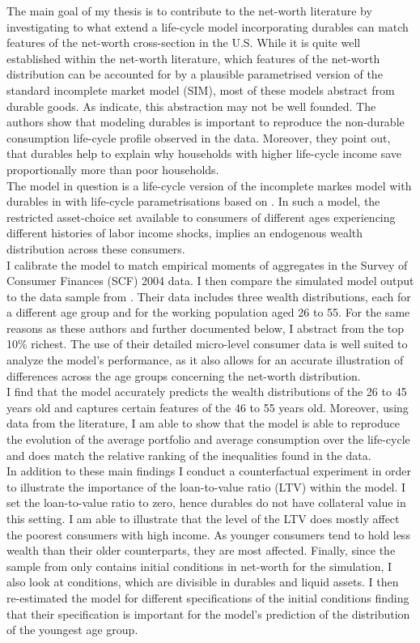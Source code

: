 \documentclass[a4paper,12pt,legno]{article}
\begin{document}
The main goal of my thesis is to contribute to the net-worth literature by investigating to what extend a life-cycle model incorporating durables can match features of the net-worth cross-section in the U.S. While it is quite well established within the net-worth literature, which features of the net-worth distribution can be accounted for by a plausible parametrised version of the standard incomplete market model (SIM), most of these models abstract from durable goods. As \cite{FV&K2011}  indicate, this abstraction may not be well founded. The authors show that modeling durables is important to reproduce the non-durable consumption life-cycle profile observed in the data. Moreover, they point out, that durables help to explain why households with higher life-cycle income save proportionally more than poor households.\\
The model in question is a life-cycle version of the incomplete markes model with durables in \cite{hintermaier2010} with life-cycle parametrisations based on \cite{hintermaier2011}. In such a model, the restricted asset-choice set available to consumers of different ages experiencing different histories of labor income shocks, implies an endogenous wealth distribution across these consumers. \\
I calibrate the model to match empirical moments of aggregates in the Survey of Consumer Finances (SCF) 2004 data. I then compare the simulated model output to the data sample from \cite{hintermaier2011}. Their data includes three wealth distributions, each for a different age group and for the working population aged 26 to 55. For the same reasons as these authors and further documented below, I abstract from the top 10\% richest. The use of their detailed micro-level consumer data is well suited to analyze the model's performance, as it also allows for an accurate illustration of differences across the age groups concerning the net-worth distribution.\\
I find that the model accurately predicts the wealth distributions of the 26 to 45 years old and captures certain features of the 46 to 55 years old. Moreover, using data from the literature, I am able to show that the model is able to reproduce the evolution of the average portfolio and average consumption over the life-cycle and does match the relative ranking of the inequalities found in the data. 
\\ 
In addition to these main findings I conduct a counterfactual experiment in order to illustrate the importance of the loan-to-value ratio (LTV) within the model. I set the loan-to-value ratio to zero, hence durables do not have collateral value in this setting. I am able to illustrate that the level of the LTV does mostly affect the poorest consumers with high income. As younger consumers tend to hold less wealth than their older counterparts, they are most affected. Finally, since the sample from \cite{hintermaier2011} only contains initial conditions in net-worth for the simulation, I also look at conditions, which are divisible in durables and liquid assets. I then re-estimated the model for different specifications of the initial conditions finding that their specification is important for the model's prediction of the distribution of the youngest age group. 
\end{document}
